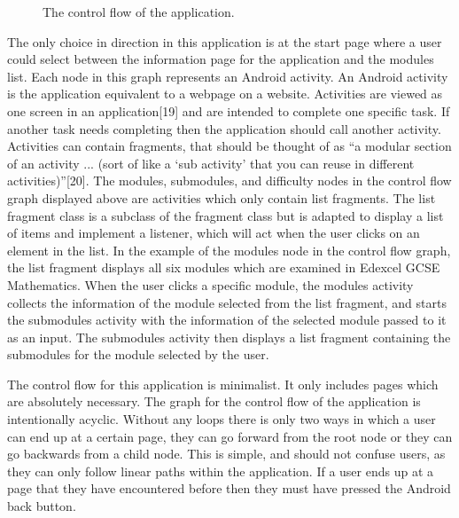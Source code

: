 \documentclass{article}
\begin{document}
\begin{figure}[H]
	\centering
	\caption{The control flow of the application.}
	\label{figure:applicationControlFlow}
\end{figure}

The only choice in direction in this application is at the start page where a user could select between the information page for the application and the modules list. Each node in this graph represents an Android activity. An Android activity is the application equivalent to a webpage on a website. Activities are viewed as one screen in an application[19] and are intended to complete one specific task. If another task needs completing then the application should call another activity. Activities can contain fragments, that should be thought of as ``a modular section of an activity ... (sort of like a `sub activity' that you can reuse in different activities)''[20]. The modules, submodules, and difficulty nodes in the control flow graph displayed above are activities which only contain list fragments. The list fragment class is a subclass of the fragment class but is adapted to display a list of items and implement a listener, which will act when the user clicks on an element in the list. In the example of the modules node in the control flow graph, the list fragment displays all six modules which are examined in Edexcel GCSE Mathematics. When the user clicks a specific module, the modules activity collects the information of the module selected from the list fragment, and starts the submodules activity with the information of the selected module passed to it as an input. The submodules activity then displays a list fragment containing the submodules for the module selected by the user. \par

The control flow for this application is minimalist. It only includes pages which are absolutely necessary. The graph for the control flow of the application is intentionally acyclic. Without any loops there is only two ways in which a user can end up at a certain page, they can go forward from the root node or they can go backwards from a child node. This is simple, and should not confuse users, as they can only follow linear paths within the application. If a user ends up at a page that they have encountered before then they must have pressed the Android back button. \par
\end{document}
